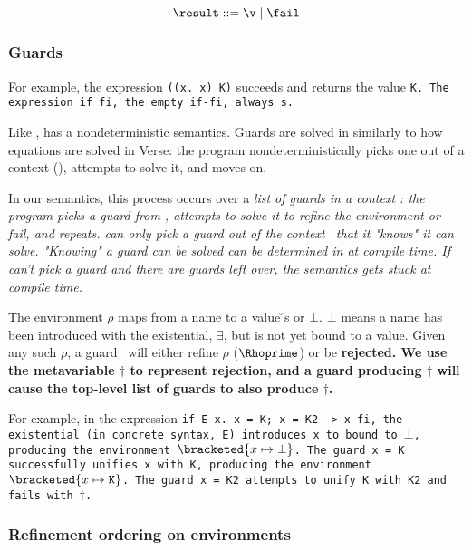 \documentclass[manuscript,screen,review, 12pt, nonacm]{acmart}
\begin{document}
    \[\result\; \rm{::=}\; \v\; \vert \; \fail \]
    
    \subsubsection{Guards}

    For example, the \VMinus expression {\tt{((}\ttbackslash\tt{x. x) K)}}
    succeeds and returns the value \tt{K}. The \VMinus expression \tt{if  fi},
    the empty \tt{if-fi}, always {\fail}s. 

    Like \VC, \VMinus has a nondeterministic semantics. Guards are solved in \VMinus
    similarly to how equations are solved in Verse: the program nondeterministically
    picks one out of a context (\context), attempts to solve it, and moves on. 

In our semantics, this process occurs over a \it{list} of guards \gs in a
context \context: the program picks a guard from \context, attempts to solve it
to refine the environment or fail, and repeats. \VMinus can only pick a guard
out of the context \context\ that it "knows" it can solve. "Knowing" a guard can
be solved can be determined in \VMinus at compile time. If \VMinus can't pick a
guard and there are guards left over, the semantics gets stuck at compile time. 



The environment $\rho$ maps from a name to a value {\v}s or $\bot$. $\bot$ means
a name has been introduced with the existential, $\exists$, but is not yet bound
to a value. Given any such $\rho$, a guard \g\ will either refine $\rho$
($\Rhoprime$) or be \bf{rejected}. We use the metavariable $\dagger$ to
represent rejection, and a guard producing $\dagger$ will cause the top-level
list of guards to also produce $\dagger$. 

    \gfail

  For example, in the \VMinus expression \tt{if E x. x = K; x = K2 -> x fi}, the
  existential (in concrete syntax, \tt{E}) introduces \tt{x} to \Rho bound to
  $\bot$, producing the environment $\bracketed{x \mapsto \bot}$. The guard
  \tt{x = K} successfully unifies \tt{x} with \tt{K}, producing the environment
  $\bracketed{x \mapsto \tt{K}}$. The guard \tt{x = K2} attempts to unify \tt{K}
  with \tt{K2} and fails with $\dagger$. 

    \subsubsection{Refinement ordering on environments}
\end{document}
